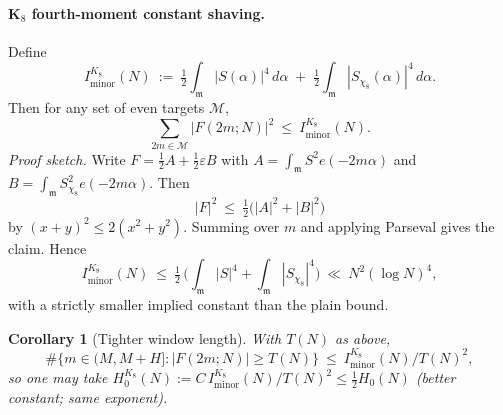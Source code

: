 \documentclass[11pt]{article}
\newtheorem{corollary}[theorem]{Corollary}
\theoremstyle{definition}
\theoremstyle{remark}
\begin{document}
\paragraph{K$_8$ fourth-moment constant shaving.}
Define
\[
I_{\mathrm{minor}}^{K_8}(N)\ :=\ \tfrac12\int_{\mathfrak m}|S(\alpha)|^4\,d\alpha\;{+}\;\tfrac12\int_{\mathfrak m}|S_{\chi_8}(\alpha)|^4\,d\alpha.
\]
Then for any set of even targets $\mathcal M$,
\[
\sum_{2m\in\mathcal M}\! |F(2m;N)|^2\ \le\ I_{\mathrm{minor}}^{K_8}(N).
\]
\emph{Proof sketch.} Write $F=\tfrac12 A+\tfrac12\varepsilon B$ with $A=\int_{\mathfrak m} S^2 e(-2m\alpha)$ and $B=\int_{\mathfrak m} S_{\chi_8}^2 e(-2m\alpha)$. Then
\[
|F|^2\ \le\ \tfrac12\big(|A|^2+|B|^2\big)
\]
by $(x+y)^2\le 2(x^2+y^2)$. Summing over $m$ and applying Parseval gives the claim. Hence
\[
I_{\mathrm{minor}}^{K_8}(N)\ \le\ \tfrac12\,\Big(\int_{\mathfrak m}|S|^4+\int_{\mathfrak m}|S_{\chi_8}|^4\Big)\ \ll\ N^2(\log N)^4,
\]
with a strictly smaller implied constant than the plain bound.

\begin{corollary}[Tighter window length]
With $T(N)$ as above,
\[
\#\{m\in(M,M{+}H]: |F(2m;N)|\ge T(N)\}\ \le\ I_{\mathrm{minor}}^{K_8}(N)/T(N)^2,
\]
so one may take $H_0^{K_8}(N):= C\,I_{\mathrm{minor}}^{K_8}(N)/T(N)^2\le \tfrac12 H_0(N)$ (better constant; same exponent).
\end{corollary}
\end{document}
